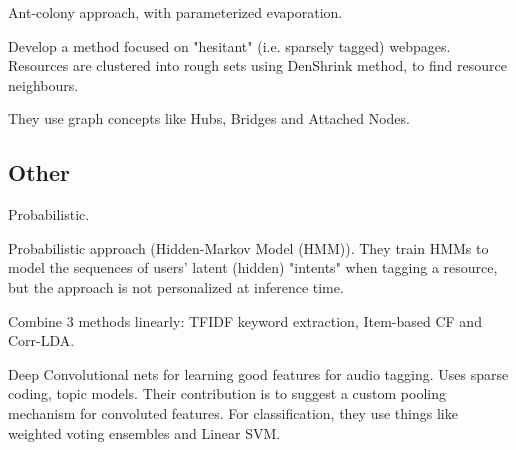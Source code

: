 \cite{sharma_bedi_2009} Ant-colony approach, with parameterized evaporation.

\cite{wang_etal_2015} Develop a method focused on "hesitant" (i.e. sparsely tagged) webpages. Resources are clustered into rough sets using DenShrink method, to find resource neighbours.

They use graph concepts like Hubs, Bridges and Attached Nodes.

\subsection{Other}

\cite{si_sun_2010} Probabilistic.

\cite{trabelsi_etal_2012} Probabilistic approach (Hidden-Markov Model (HMM)). They train HMMs to model the sequences of users' latent (hidden) "intents" when tagging a resource, but the approach is not personalized at inference time.

\cite{liu_etal_2013} Combine 3 methods linearly: TFIDF keyword extraction, Item-based CF and Corr-LDA.



\cite{sattigeri_etal_2014}
Deep Convolutional nets for learning good features for audio tagging. Uses sparse coding, topic models.
Their contribution is to suggest a custom pooling mechanism for convoluted features.
For classification, they use things like weighted voting ensembles and Linear SVM.


